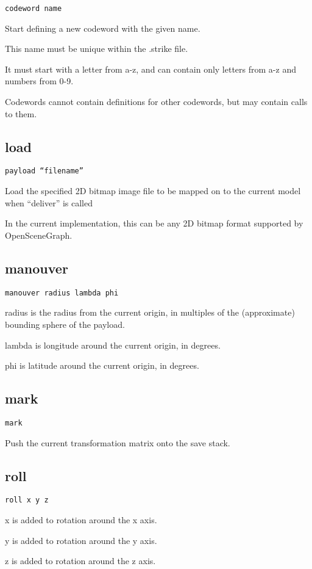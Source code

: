 \documentclass[12pt]{article}
\begin{document}
\texttt{codeword name}

Start defining a new codeword with the given name.

This name must be unique within the .strike file.

It must start with a letter from a-z, and can contain only letters from a-z and numbers from 0-9.

Codewords cannot contain definitions for other codewords, but may contain calls to them.

\subsection{load}

\texttt{payload ``filename''}

Load the specified 2D bitmap image file to be mapped on to the current model when ``deliver'' is called

In the current implementation, this can be any 2D bitmap format supported by OpenSceneGraph.

\subsection{manouver}

\texttt{manouver radius lambda phi}

radius is the radius from the current origin, in multiples of the (approximate) bounding sphere of the payload.

lambda is longitude around the current origin, in degrees.

phi is latitude around the current origin, in degrees.

\subsection{mark}

\texttt{mark}

Push the current transformation matrix onto the save stack. 

\subsection{roll}

\texttt{roll x y z}

x is added to rotation around the x axis.

y is added to rotation around the y axis.

z is added to rotation around the z axis.
\end{document}
